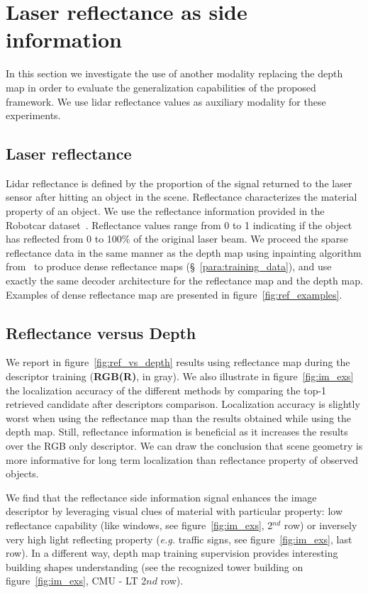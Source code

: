 \section{Laser reflectance as side information}

\label{sec:modality_ref}


In this section we investigate the use of another modality replacing the depth map in order to evaluate the generalization capabilities of the proposed framework. We use lidar reflectance values as auxiliary modality for these experiments.

\subsection{Laser reflectance}
Lidar reflectance is defined by the proportion of the signal returned to the laser sensor after hitting an object in the scene. Reflectance characterizes the material property of an object. We use the reflectance information provided in the Robotcar dataset~\cite{Maddern2016}. Reflectance values range from 0 to 1 indicating if the object has reflected from 0 to 100\% of the original laser beam. We proceed the sparse reflectance data in the same manner as the depth map using inpainting algorithm from~\cite{Bevilacqua2017} to produce dense reflectance maps (\S~\ref{para:training_data}), and use exactly the same decoder architecture for the reflectance map and the depth map. Examples of dense reflectance map are presented in figure~\ref{fig:ref_examples}.

\subsection{Reflectance versus Depth}
We report in figure~\ref{fig:ref_vs_depth} results using reflectance map during the descriptor training (\textbf{RGB(R)}, in gray). We also illustrate in figure~\ref{fig:im_exs} the localization accuracy of the different methods by comparing the top-1 retrieved candidate after descriptors comparison. Localization accuracy is slightly worst when using the reflectance map than the results obtained while using the depth map. Still, reflectance information is beneficial as it increases the results over the RGB only descriptor. We can draw the conclusion that scene geometry is more informative for long term localization than reflectance property of observed objects.

We find that the reflectance side information signal enhances the image descriptor by leveraging visual clues of material with particular property: low reflectance capability (like windows, see figure~\ref{fig:im_exs}, 2$^{nd}$ row) or inversely very high light reflecting property (\textit{e.g.} traffic signs, see figure~\ref{fig:im_exs}, last row). In a different way, depth map training supervision provides interesting building shapes understanding (see the recognized tower building on figure~\ref{fig:im_exs}, CMU - LT 2$nd$ row).


